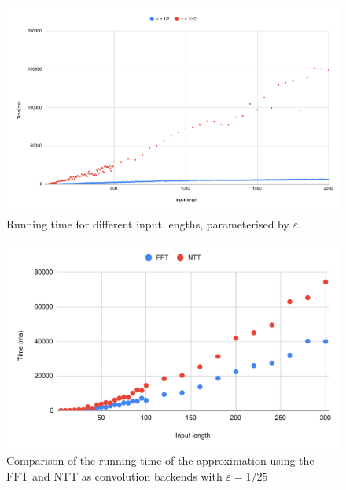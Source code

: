 \begin{figure}[h!]
    \centering
    \includegraphics[width=\linewidth]{charts/input_length.pdf}
    \caption{Running time for different input lengths, parameterised by $\varepsilon$.}
    \label{fig:chart}
\end{figure}

\begin{figure}[h!]
    \centering
    \includegraphics[width=\linewidth]{charts/fft_ntt.pdf}
    \caption{Comparison of the running time of the approximation using the FFT and NTT as convolution backends with $\varepsilon = 1/25$  }
    \label{fig:chart}
\end{figure}

